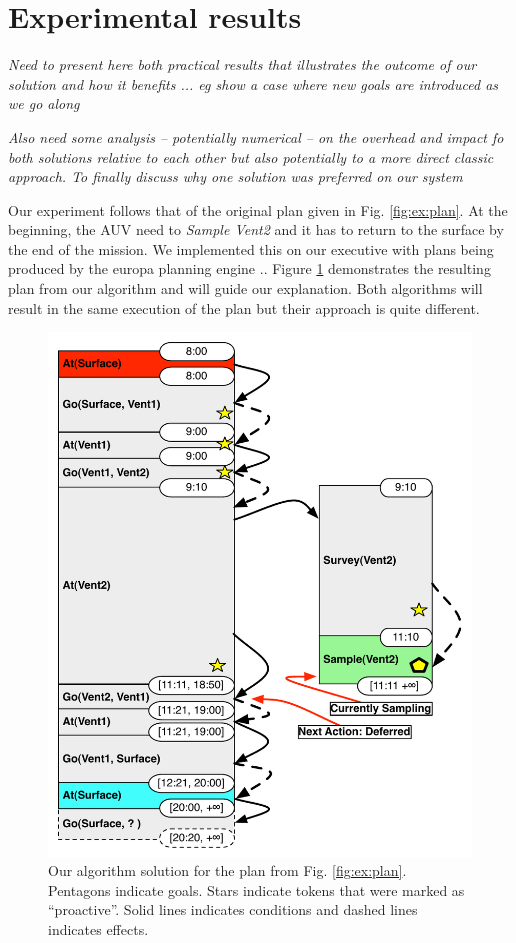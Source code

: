 
\section{Experimental results}
\label{sec:exp}

{\em\color{gray} Need to present here both practical results that illustrates the outcome of our solution and how it benefits ... eg show a case where new goals are introduced as we go along}

{\em\color{gray} Also need some analysis -- potentially numerical -- on the overhead and impact fo both solutions relative to each other but also potentially to a more direct classic approach. 
To finally discuss why one solution was preferred on our system} 

Our experiment follows that of the original plan given in
Fig. \ref{fig:ex:plan}. At the beginning, the AUV need to {\em Sample Vent2}
and it has to return to the surface by the end of the mission. We
implemented this on our executive with plans being produced by the
europa planning engine \cite{frank2003}.. Figure \ref{fig:ex:mixed1}
demonstrates the resulting plan from our algorithm and will guide our
explanation. Both algorithms will result in the same execution of the
plan but their approach is quite different.

\begin{figure}
  \centering
  \includegraphics[width=0.8\columnwidth]{figs/example_MixedInitial}
  \caption{Our algorithm solution for the plan from
    Fig. \ref{fig:ex:plan}. Pentagons indicate goals. Stars indicate tokens that were marked
  as ``proactive''. Solid lines indicates conditions and dashed lines indicates effects.}
  \label{fig:ex:mixed1}
\end{figure}

